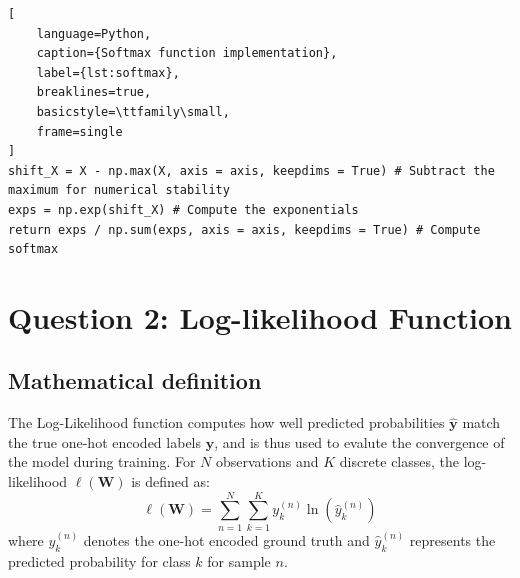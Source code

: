 \documentclass[11pt]{article}
\begin{document}
\begin{lstlisting}[
    language=Python, 
    caption={Softmax function implementation},
    label={lst:softmax},
    breaklines=true,
    basicstyle=\ttfamily\small,
    frame=single
]
shift_X = X - np.max(X, axis = axis, keepdims = True) # Subtract the maximum for numerical stability
exps = np.exp(shift_X) # Compute the exponentials
return exps / np.sum(exps, axis = axis, keepdims = True) # Compute softmax
\end{lstlisting}

\section*{Question 2: Log-likelihood Function}
\subsection*{Mathematical definition}
The Log-Likelihood function computes how well predicted probabilities $\mathbf{\hat{y}}$ match the true one-hot encoded labels $\mathbf{y}$, and is thus used to evalute the convergence of the model during training. 
For $N$ observations and $K$ discrete classes, the log-likelihood $\ell(\mathbf{W})$ is defined as:
\begin{equation}
\ell(\mathbf{W}) = \sum_{n=1}^{N} \sum_{k=1}^{K} y_{k}^{(n)} \ln \left( \hat{y}_{k}^{(n)} \right)
\end{equation}
where $y_{k}^{(n)}$ denotes the one-hot encoded ground truth and $\hat{y}_{k}^{(n)}$ represents the predicted probability for class $k$ for sample $n$.
\end{document}
